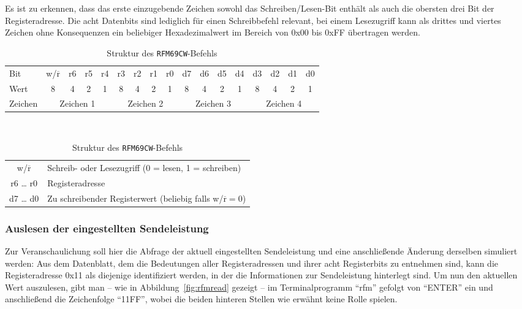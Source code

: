 \documentclass[pdftex, parskip, numbers=noenddot, toc=listof]{scrbook}
\begin{document}
	Es ist zu erkennen, dass das erste einzugebende Zeichen sowohl das Schreiben/Lesen-Bit enthält als auch die obersten drei Bit der Registeradresse. Die acht Datenbits sind lediglich für einen Schreibbefehl relevant, bei einem Lesezugriff kann als drittes und viertes Zeichen ohne Konsequenzen ein beliebiger Hexadezimalwert im Bereich von 0x00 bis 0xFF übertragen werden.

	\begin{table}[hb]
		\begin{center}
			\begin{tabularx}{.95\textwidth}{Xc|*{7}c|*{8}c}
				\hline
				Bit  & w/$\overline{\mbox{r}}$ & r6 & r5 & r4                      & r3 & r2 & r1 & r0                      & d7 & d6 & d5 & d4                      & d3 & d2 & d1 & d0                    \\
				Wert & 8                       & 4  & 2  & \multicolumn{1}{c||}{1} & 8  & 4  & 2  & \multicolumn{1}{c||}{1} & 8  & 4  & 2  & \multicolumn{1}{c||}{1} & 8  & 4  & 2  & \multicolumn{1}{c}{1} \\
				Zeichen & \multicolumn{4}{c||}{Zeichen 1} & \multicolumn{4}{c||}{Zeichen 2} & \multicolumn{4}{c||}{Zeichen 3} & \multicolumn{4}{c}{Zeichen 4} \\ \hline
			\end{tabularx}
			\vspace*{1cm} \\
			\begin{tabularx}{.8\textwidth}{cX}
				\hline
				w/$\overline{\mbox{r}}$ & Schreib- oder Lesezugriff (0 = lesen, 1 = schreiben)                      \\
				r6 {\dots} r0           & Registeradresse                                                           \\
				d7 {\dots} d0           & Zu schreibender Registerwert (beliebig falls w/$\overline{\mbox{r}} = 0$) \\ \hline
			\end{tabularx}
		\end{center}
		\caption{Struktur des \texttt{RFM69CW}-Befehls}
		\label{tab:rfmcommand}
	\end{table}

	\subsubsection{Auslesen der eingestellten Sendeleistung}
	\label{subsec:readpower}

	Zur Veranschaulichung soll hier die Abfrage der aktuell eingestellten Sendeleistung und eine anschließende Änderung derselben simuliert werden: Aus dem Datenblatt, dem die Bedeutungen aller Registeradressen und ihrer acht Registerbits zu entnehmen sind, kann die Registeradresse 0x11 als diejenige identifiziert werden, in der die Informationen zur Sendeleistung hinterlegt sind. Um nun den aktuellen Wert auszulesen, gibt man -- wie in Abbildung~\ref{fig:rfmread} gezeigt -- im Terminalprogramm \enquote{rfm} gefolgt von \enquote{ENTER} ein und anschließend die Zeichenfolge \enquote{11FF}, wobei die beiden hinteren Stellen wie erwähnt keine Rolle spielen.
\end{document}
